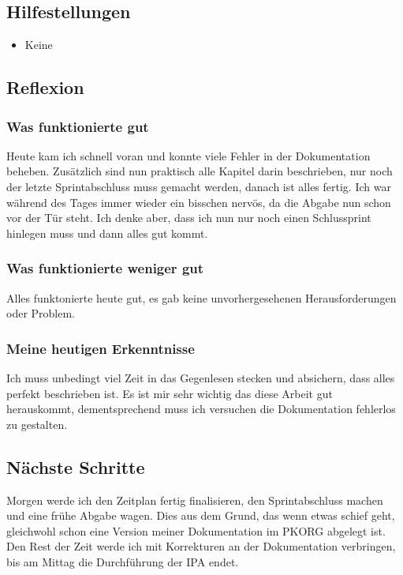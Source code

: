 \subsection*{Hilfestellungen}
\begin{itemize}
    \item Keine
\end{itemize}

\subsection*{Reflexion}

\subsubsection*{Was funktionierte gut}
Heute kam ich schnell voran und konnte viele Fehler in der Dokumentation beheben. Zusätzlich sind nun praktisch alle Kapitel darin beschrieben, nur noch der letzte 
Sprintabschluss muss gemacht werden, danach ist alles fertig. Ich war während des Tages immer wieder ein bisschen nervös, da die Abgabe nun schon vor der Tür steht.
Ich denke aber,  dass ich nun nur noch einen Schlussprint hinlegen muss und dann alles gut kommt.

\subsubsection*{Was funktionierte weniger gut}
Alles funktonierte heute gut, es gab keine unvorhergesehenen Herausforderungen oder Problem.

\subsubsection*{Meine heutigen Erkenntnisse}
Ich muss unbedingt viel Zeit in das Gegenlesen stecken und absichern, dass alles perfekt beschrieben ist. Es ist mir sehr wichtig das
diese Arbeit gut herauskommt, dementsprechend muss ich versuchen die Dokumentation fehlerlos zu gestalten.

\subsection*{Nächste Schritte}
Morgen werde ich den Zeitplan fertig finalisieren, den Sprintabschluss machen und eine frühe Abgabe wagen. Dies aus dem Grund, das wenn etwas schief geht,
gleichwohl schon eine Version meiner Dokumentation im PKORG abgelegt ist. Den Rest der Zeit werde ich mit Korrekturen an der Dokumentation verbringen, bis am Mittag
die Durchführung der IPA endet.

\pagebreak
